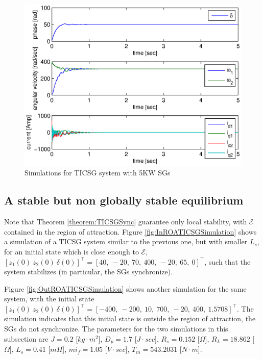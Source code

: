 \documentclass[letterpaper,10pt,conference]{ieeeconf}
\newcommand{\m}      {{\hbox{\hskip 1pt}}}
\newcommand{\Emscr}  {{\mathcal{E}}}
\begin{document}
\begin{figure}[ht] %
\includegraphics[scale=0.65]{5KWTICSGSimulation} \vspace{-8mm}
\caption{Simulations for TICSG system with 5KW SGs} 
\label{fig:5KWSGTICSGSimulation}
\end{figure}

\subsection{A stable but non globally stable equilibrium}

Note that Theorem \ref{theorem:TICSGSync} guarantee only local
stability, with $\Emscr$ contained in the region of attraction. 
Figure \ref{fig:InROATICSGSimulation} shows a simulation of a TICSG 
system similar to the previous one, but with smaller $L_s$, for an
initial state which is close enough to $\Emscr$, $\left[z_1(0)\ z_2(0)
\ \delta(0)\right]^\top=\left[40,\ -20,\ 70,\ 400,\ -20,\ 65,\ 0
\right]^\top$, such that the system stabilizes (in particular, the SGs
synchronize). 

Figure \ref{fig:OutROATICSGSimulation} shows another simulation for
the same system, with the initial state $\left[z_1(0)\ z_2(0) \
\delta(0) \right]^\top=\left[-400,\ -200,\ 10,\ 700,\ -20,\ 400,\
1.5708\right]^\top$. \m The simu\-lation indicates that this initial
state is outside the region of attraction, the SGs do not
synchronize. The parameters for the two simulations in this subsection
are $J=0.2$ {[}$kg\cdot m^{2}${]}, $D_{p}=1.7$ {[}$J\cdot sec${]}, 
$R_s=0.152$ {[}$\Omega]$, $R_L=18.862$ {[}$\Omega]$, $L_{s}=0.41$ 
{[}$mH${]}, $mi_f=1.05$ {[}$V\cdot sec]$, $T_m=543.2031$ 
{[}$N\cdot m${]}.
\end{document}
